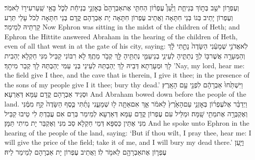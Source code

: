 {וְעֶפְר֥וֹן יֹשֵׁ֖ב בְּת֣וֹךְ בְּנֵי\maqqaf חֵ֑ת וַיַּ֩עַן֩ עֶפְר֨וֹן הַחִתִּ֤י אֶת\maqqaf אַבְרָהָם֙ בְּאׇזְנֵ֣י בְנֵי\maqqaf חֵ֔ת לְכֹ֛ל בָּאֵ֥י שַֽׁעַר\maqqaf עִיר֖וֹ לֵאמֹֽר׃}
{וְעֶפְרוֹן יָתֵיב בְּגוֹ בְּנֵי חִתָּאָה וַאֲתֵיב עֶפְרוֹן חִתָּאָה יָת אַבְרָהָם קֳדָם בְּנֵי חִתָּאָה לְכֹל עָלֵי תְּרַע קַרְתֵּיהּ לְמֵימַר׃}
{Now Ephron was sitting in the midst of the children of Heth; and Ephron the Hittite answered Abraham in the hearing of the children of Heth, even of all that went in at the gate of his city, saying:}{}
{לֹֽא\maqqaf אֲדֹנִ֣י שְׁמָעֵ֔נִי הַשָּׂדֶה֙ נָתַ֣תִּי לָ֔ךְ וְהַמְּעָרָ֥ה אֲשֶׁר\maqqaf בּ֖וֹ לְךָ֣ נְתַתִּ֑יהָ לְעֵינֵ֧י בְנֵי\maqqaf עַמִּ֛י נְתַתִּ֥יהָ לָּ֖ךְ קְבֹ֥ר מֵתֶֽךָ׃}
{לָא רִבּוֹנִי קַבֵּיל מִנִּי חַקְלָא יְהַבִית לָךְ וּמְעָרְתָא דְּבֵיהּ לָךְ יְהַבְתַּהּ לְעֵינֵי בְּנֵי עַמִּי יְהַבְתַּהּ לָךְ קְבַר מִיתָךְ׃}
{’Nay, my lord, hear me: the field give I thee, and the cave that is therein, I give it thee; in the presence of the sons of my people give I it thee; bury thy dead.’}{}
{וַיִּשְׁתַּ֙חוּ֙ אַבְרָהָ֔ם לִפְנֵ֖י עַ֥ם הָאָֽרֶץ׃}
{וּסְגֵיד אַבְרָהָם קֳדָם עַמָּא דְּאַרְעָא׃}
{And Abraham bowed down before the people of the land.}{}
{וַיְדַבֵּ֨ר אֶל\maqqaf עֶפְר֜וֹן בְּאׇזְנֵ֤י עַם\maqqaf הָאָ֙רֶץ֙ לֵאמֹ֔ר אַ֛ךְ אִם\maqqaf אַתָּ֥ה ל֖וּ שְׁמָעֵ֑נִי נָתַ֜תִּי כֶּ֤סֶף הַשָּׂדֶה֙ קַ֣ח מִמֶּ֔נִּי וְאֶקְבְּרָ֥ה אֶת\maqqaf מֵתִ֖י שָֽׁמָּה׃}
{וּמַלֵּיל עִם עֶפְרוֹן קֳדָם עַמָּא דְּאַרְעָא לְמֵימַר בְּרַם אִם עֲבַדְתְּ לִי טֵיבוּ קַבֵּיל מִנִּי אֶתֵּין כַּסְפָּא דְּמֵי חַקְלָא סַב מִנִּי וְאֶקְבַּר יָת מִיתִי תַּמָּן׃}
{And he spoke unto Ephron in the hearing of the people of the land, saying: ‘But if thou wilt, I pray thee, hear me: I will give the price of the field; take it of me, and I will bury my dead there.’}{}
{וַיַּ֧עַן עֶפְר֛וֹן אֶת\maqqaf אַבְרָהָ֖ם לֵאמֹ֥ר לֽוֹ׃}
{וַאֲתֵיב עֶפְרוֹן יָת אַבְרָהָם לְמֵימַר לֵיהּ׃}
